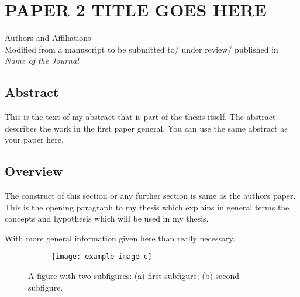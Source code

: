 \chapter{PAPER 2 TITLE GOES HERE}

\begin{center}
    Authors and Affiliations \\
    Modified from a manuscript to be submitted to/ under review/ published in \textit{Name of the Journal}
\end{center}

\section{Abstract}
This is the text of my abstract that is part of the thesis itself.
The abstract describes the work in the first paper general. You can use the same abstract as your paper here.



\section{Overview}

The  construct of this section or any further section is same as the authors paper.
This is the opening paragraph to my thesis which
explains in general terms the concepts and hypothesis
which will be used in my thesis.

With more general information given here than really
necessary.
\begin{figure}[b]
	\begin{subfigure}[c]{0.495\textwidth}
	\centering\texttt{[image: example-image-c]}%
	\subcaption{\label{fig:2a}}
	\end{subfigure}
	\begin{subfigure}[c]{0.495\textwidth}
	\subcaption{\label{fig:2b}}%
	\end{subfigure}%
	\caption{A figure with two subfigures: (a) first subfigure; (b) second subfigure.\label{fig:2}}
\end{figure}

